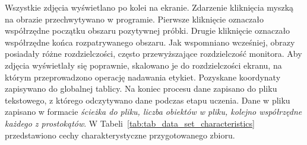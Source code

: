 %
%
Wszystkie zdjęcia wyświetlano po kolei na ekranie.
Zdarzenie kliknięcia myszką na obrazie przechwytywano w programie.
Pierwsze kliknięcie oznaczało współrzędne początku obszaru pozytywnej próbki.
Drugie kliknięcie oznaczało współrzędne końca rozpatrywanego obszaru.
Jak wspomniano wcześniej, obrazy posiadały różne rozdzielczości, często przewyższające rozdzielczość monitora.
Aby zdjęcia wyświetlały się poprawnie, skalowano je do rozdzielczości ekranu, na którym przeprowadzono operację nadawania etykiet.
Pozyskane koordynaty zapisywano do globalnej tablicy.
Na koniec procesu dane zapisano do pliku tekstowego, z którego odczytywano dane podczas etapu uczenia.
Dane w pliku zapisano w formacie \textit{ścieżka do pliku, liczba obiektów w pliku, kolejno współrzędne każdego z prostokątów}.
W Tabeli~\ref{tab:tab_data_set_characteristics} przedstawiono cechy charakterystyczne przygotowanego zbioru.
